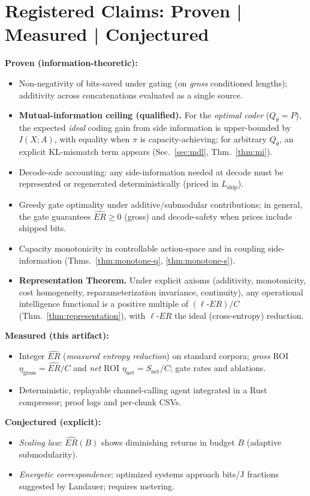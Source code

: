 \documentclass[12pt,a4paper]{article}
\newcommand{\ERideal}{\ell\text{-}ER}
\begin{document}
\section{Registered Claims: Proven \;|\; Measured \;|\; Conjectured}
\label{sec:claims}
\textbf{Proven (information-theoretic):}
\begin{itemize}
\item Non-negativity of bits-saved under gating (on \emph{gross} conditioned lengths); additivity across concatenations evaluated as a single source.
\item \textbf{Mutual-information ceiling (qualified).} For the \emph{optimal coder} ($Q_\theta=P$), the expected \emph{ideal} coding gain from side information is upper-bounded by $I(X;A)$, with equality when $\pi$ is capacity-achieving; for arbitrary $Q_\theta$, an explicit KL-mismatch term appears (Sec.~\ref{sec:mdl}, Thm.~\ref{thm:mi}).
\item Decode-safe accounting: any side-information needed at decode must be represented or regenerated deterministically (priced in $L_{\mathrm{ship}}$).
\item Greedy gate optimality under additive/submodular contributions; in general, the gate guarantees $\widehat{ER}\ge 0$ (gross) and decode-safety when prices include shipped bits.
\item Capacity monotonicity in controllable action-space and in coupling side-information (Thms.~\ref{thm:monotone-q}, \ref{thm:monotone-s}).
\item \textbf{Representation Theorem.} Under explicit axioms (additivity, monotonicity, cost homogeneity, reparameterization invariance, continuity), any operational intelligence functional is a positive multiple of $(\ERideal)/C$ (Thm.~\ref{thm:representation}), with $\ERideal$ the ideal (cross-entropy) reduction.
\end{itemize}
\textbf{Measured (this artifact):}
\begin{itemize}
\item Integer $\widehat{ER}$ (\emph{measured entropy reduction}) on standard corpora; \emph{gross} ROI $\eta_{\text{gross}}=\widehat{ER}/C$ and \emph{net} ROI $\eta_{\text{net}}=S_{\text{net}}/C$; gate rates and ablations.
\item Deterministic, replayable channel-calling agent integrated in a Rust compressor; proof logs and per-chunk CSVs.
\end{itemize}
\textbf{Conjectured (explicit):}
\begin{itemize}
\item \emph{Scaling law}: $\widehat{ER}(B)$ shows diminishing returns in budget $B$ (adaptive submodularity).
\item \emph{Energetic correspondence}: optimized systems approach bits/J fractions suggested by Landauer; requires metering.
\end{itemize}
\end{document}
